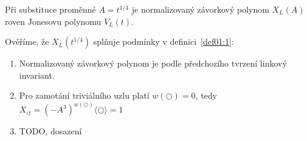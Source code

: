 \begin{tvrz}\label{t01:6}
Při substituce proměnné $A = t^{1/4}$ je normalizovaný závorkový polynom $X_L(A)$  roven Jonesovu polynomu $V_L(t)$.
\end{tvrz}
\begin{dukaz}
Ověříme, že $X_L(t^{1/4})$ splňuje podmínky v definici~\ref{def01:1}:

\begin{enumerate}
\item
Normalizovaný závorkový polynom je podle předchozího tvrzení linkový invariant.
\item
Pro zamotání triviálního uzlu platí $w( \bigcirc) = 0$, tedy $X_\circlearrowleft = (-A^3)^{w( \bigcirc)} \langle \bigcirc  \rangle = 1$ 
\item
TODO, dosazení
\end{enumerate}
$ $
\end{dukaz}
